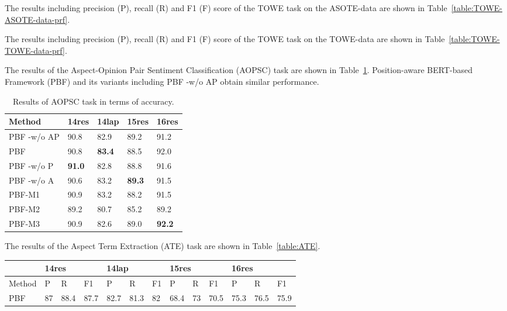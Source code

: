 \documentclass[11pt]{article}
\begin{document}
The results including precision (P), recall (R) and F1 (F) score of the TOWE task  on the ASOTE-data are shown in Table~\ref{table:TOWE-ASOTE-data-prf}.

The results including precision (P), recall (R) and F1 (F) score of the TOWE task  on the TOWE-data are shown in Table~\ref{table:TOWE-TOWE-data-prf}.

The results of the Aspect-Opinion Pair Sentiment Classification (AOPSC) task are shown in Table~\ref{table:AOPSC}. Position-aware BERT-based Framework (PBF) and its variants including PBF -w/o AP obtain similar performance. 

\begin{table}
	\centering
	\begin{tabular}{|l|l|l|l|l|}
		\hline
		Method        & 14res       & 14lap         & 15res         & 16res         \\ \hline
		PBF -w/o AP   & 90.8        & 82.9          & 89.2          & 91.2          \\ \hline
		PBF           & 90.8        & \textbf{83.4} & 88.5          & 92.0            \\ \hline
		PBF -w/o P    & \textbf{91.0} & 82.8          & 88.8          & 91.6          \\ \hline
		PBF -w/o A & 90.6        & 83.2          & \textbf{89.3} & 91.5          \\ \hline
		PBF-M1     & 90.9        & 83.2          & 88.2          & 91.5          \\ \hline
		PBF-M2     & 89.2        & 80.7          & 85.2          & 89.2          \\ \hline
		PBF-M3        & 90.9        & 82.6          & 89.0            & \textbf{92.2} \\ \hline
	\end{tabular}
	\caption{\label{table:AOPSC} Results of AOPSC task in terms of accuracy.}
\end{table}

The results of the Aspect Term Extraction (ATE) task are shown in Table~\ref{table:ATE}.
\begin{table*}
	\centering
	\begin{tabular}{|l|l|l|l|l|l|l|l|l|l|l|l|l|}
		\hline
		& \multicolumn{3}{l|}{14res} & \multicolumn{3}{l|}{14lap} & \multicolumn{3}{l|}{15res} & \multicolumn{3}{l|}{16res} \\ \hline
		Method & P      & R       & F1      & P        & R       & F1    & P        & R     & F1      & P       & R       & F1     \\ \hline
		PBF    & 87     & 88.4    & 87.7    & 82.7     & 81.3    & 82    & 68.4     & 73    & 70.5    & 75.3    & 76.5    & 75.9   \\ \hline
	\end{tabular}
	\caption{\label{table:ATE} Results of the Aspect Term Extraction (ATE) task.}
\end{table*}
\end{document}
